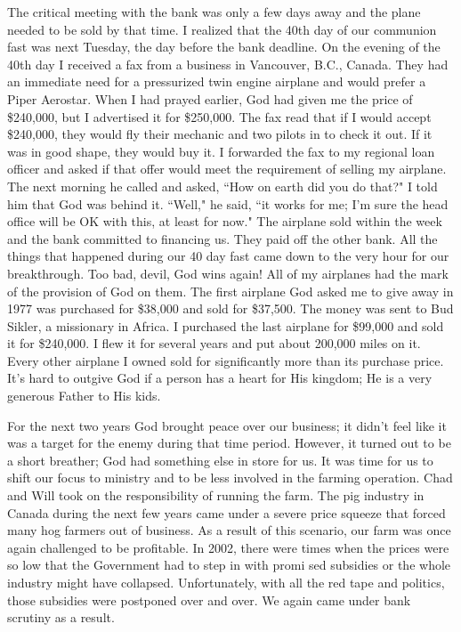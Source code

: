 \documentclass[oneside]{book}
\begin{document}
The critical meeting with the bank was only a few days away and the plane needed to be sold by that time. I realized that the 40th day of our communion fast was next Tuesday, the day before the bank deadline. On the evening of the 40th day I received a fax from a business in Vancouver, B.C., Canada. They had an immediate need for a pressurized twin engine airplane and would prefer a Piper Aerostar. When I had prayed earlier, God had given me the price of \$240,000, but I advertised it for \$250,000. The fax read that if I would accept \$240,000, they would fly their mechanic and two pilots in to check it out. If it was in good shape, they would buy it. I forwarded the fax to my regional loan officer and asked if that offer would meet the requirement of selling my airplane. The next morning he called and asked, ``How on earth did you do that?" I told him that God was behind it. ``Well," he said, ``it works for me; I'm sure the head office will be OK with this, at least for now." The airplane sold within the week and the bank committed to financing us. They paid off the other bank. All the things that happened during our 40 day fast came down to the very hour for our breakthrough. Too bad, devil, God wins again! All of my airplanes had the mark of the provision of God on them. The first airplane God asked me to give away in 1977 was purchased for \$38,000 and sold for \$37,500. The money was sent to Bud Sikler, a missionary in Africa. I purchased the last airplane for \$99,000 and sold it for \$240,000. I flew it for several years and put about 200,000 miles on it. Every other airplane I owned sold for significantly more than its purchase price. It's hard to outgive God if a person has a heart for His kingdom; He is a very generous Father to His kids.

For the next two years God brought peace over our business; it didn't feel like it was a target for the enemy during that time period. However, it turned out to be a short breather; God had something else in store for us. It was time for us to shift our focus to ministry and to be less involved in the farming operation. Chad and Will took on the responsibility of running the farm. The pig industry in Canada during the next few years came under a severe price squeeze that forced many hog farmers out of business. As a result of this scenario, our farm was once again challenged to be profitable. In 2002, there were times when the prices were so low that the Government had to step in with promi
sed subsidies or the whole industry might have collapsed. Unfortunately, with all the red tape and politics, those subsidies were postponed over and over. We again came under bank scrutiny as a result.
\end{document}
